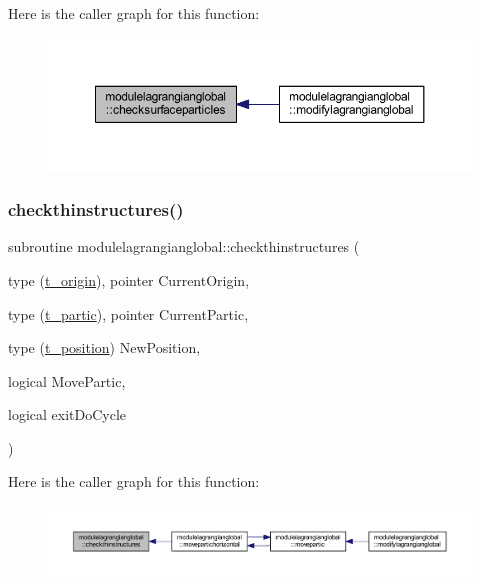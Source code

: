 Here is the caller graph for this function\+:\nopagebreak
\begin{figure}[H]
\begin{center}
\leavevmode
\includegraphics[width=350pt]{namespacemodulelagrangianglobal_af1cf941e45155a5b9a97ed3fe09f5c58_icgraph}
\end{center}
\end{figure}
\mbox{\label{namespacemodulelagrangianglobal_a48ae2541ace36a54cdc28eebb4617d29}} 
\subsubsection{\texorpdfstring{checkthinstructures()}{checkthinstructures()}}
{\footnotesize\ttfamily subroutine modulelagrangianglobal\+::checkthinstructures (\begin{DoxyParamCaption}\item[{type (\mbox{\hyperlink{structmodulelagrangianglobal_1_1t__origin}{t\+\_\+origin}}), pointer}]{Current\+Origin,  }\item[{type (\mbox{\hyperlink{structmodulelagrangianglobal_1_1t__partic}{t\+\_\+partic}}), pointer}]{Current\+Partic,  }\item[{type (\mbox{\hyperlink{structmodulelagrangianglobal_1_1t__position}{t\+\_\+position}})}]{New\+Position,  }\item[{logical}]{Move\+Partic,  }\item[{logical}]{exit\+Do\+Cycle }\end{DoxyParamCaption})\hspace{0.3cm}{\ttfamily [private]}}

Here is the caller graph for this function\+:\nopagebreak
\begin{figure}[H]
\begin{center}
\leavevmode
\includegraphics[width=350pt]{namespacemodulelagrangianglobal_a48ae2541ace36a54cdc28eebb4617d29_icgraph}
\end{center}
\end{figure}
\mbox{\label{namespacemodulelagrangianglobal_a5ea7cad6f4171c5a773fbc1d09c57ebd}} 
